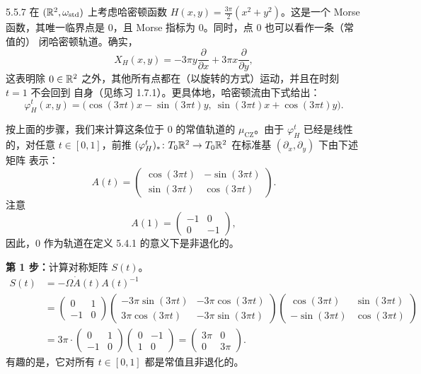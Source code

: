 \begin{wexam}{5.5.7}
  在 $(\mathbb{R}^2,\omega_{\mathrm{std}})$ 上考虑哈密顿函数 $H(x,y)=\frac{3\pi}{2}(x^2+y^2)$。这是一个
  Morse 函数，其唯一临界点是 $0$，且 Morse 指标为 $0$。同时，点 $0$ 也可以看作一条（常值的）
  闭哈密顿轨道。确实，
  \[
    X_H(x,y)=-3\pi y\frac{\partial}{\partial x}+3\pi x\frac{\partial}{\partial y},
  \]
  这表明除 $0\in\mathbb{R}^2$ 之外，其他所有点都在（以旋转的方式）运动，并且在时刻 $t=1$ 不会回到
  自身（见练习 1.7.1）。更具体地，哈密顿流由下式给出：
  \begin{equation}\tag{5.28}
    \varphi_H^t(x,y)=\bigl(\cos(3\pi t)x-\sin(3\pi t)y,\
      \sin(3\pi t)x+\cos(3\pi t)y\bigr).
  \end{equation}

  按上面的步骤，我们来计算这条位于 $0$ 的常值轨道的 $\mu_{\mathrm{CZ}}$。由于 $\varphi_H^t$
  已经是线性的，对任意 $t\in[0,1]$，前推
  $(\varphi_H^t)_*\colon T_0\mathbb{R}^2\to T_0\mathbb{R}^2$ 在标准基 $(\partial_x,\partial_y)$ 下由下述矩阵
  表示：
  \[
    A(t)=\begin{pmatrix}
      \cos(3\pi t) & -\sin(3\pi t)\\
      \sin(3\pi t) & \cos(3\pi t)
    \end{pmatrix}.
  \]
  注意
  \[
    A(1)=\begin{pmatrix}-1&0\\0&-1\end{pmatrix},
  \]
  因此，$0$ 作为轨道在定义 5.4.1 的意义下是非退化的。

  \textbf{第 1 步：}计算对称矩阵 $S(t)$。
  \begin{equation*}
  \begin{aligned}
    S(t)&=-\Omega\dot A(t)A(t)^{-1}\\
      &=\begin{pmatrix}0&1\\-1&0\end{pmatrix}
        \begin{pmatrix}-3\pi\sin(3\pi t)&-3\pi\cos(3\pi t)\\
                       3\pi\cos(3\pi t)&-3\pi\sin(3\pi t)\end{pmatrix}
        \begin{pmatrix}\cos(3\pi t)&\sin(3\pi t)\\
                       -\sin(3\pi t)&\cos(3\pi t)\end{pmatrix}\\
      &=3\pi\cdot\begin{pmatrix}0&1\\-1&0\end{pmatrix}
        \begin{pmatrix}0&-1\\1&0\end{pmatrix}
       =\begin{pmatrix}3\pi&0\\0&3\pi\end{pmatrix}.
  \end{aligned}
  \end{equation*}
  有趣的是，它对所有 $t\in[0,1]$ 都是常值且非退化的。


\end{wexam}
